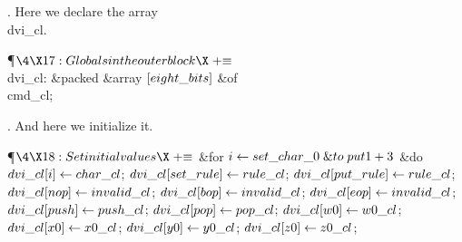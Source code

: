 . Here we declare the array \\{dvi\_cl}.

\Y\P$\4\X17:Globals in the outer block\X\mathrel{+}\S$\6
\4\\{dvi\_cl}: \&{packed} \&{array} $[\\{eight\_bits}]$ \1\&{of}\5
\\{cmd\_cl};\2\par
\fi

. And here we initialize it.

\Y\P$\4\X18:Set initial values\X\mathrel{+}\S$\6
\&{for} $\hbox{$i$}\gets\\{set\_char\_0}\mathrel{\&{to}}\\{put1}+3$ \1\&{do}\5
$\\{dvi\_cl}[\hbox{$i$}]\gets\\{char\_cl}$;\2\6
$\\{dvi\_cl}[\\{set\_rule}]\gets\\{rule\_cl}$;\5
$\\{dvi\_cl}[\\{put\_rule}]\gets\\{rule\_cl}$;\6
$\\{dvi\_cl}[\\{nop}]\gets\\{invalid\_cl}$;\5
$\\{dvi\_cl}[\\{bop}]\gets\\{invalid\_cl}$;\5
$\\{dvi\_cl}[\\{eop}]\gets\\{invalid\_cl}$;\6
$\\{dvi\_cl}[\\{push}]\gets\\{push\_cl}$;\5
$\\{dvi\_cl}[\\{pop}]\gets\\{pop\_cl}$;\6
$\\{dvi\_cl}[\\{w0}]\gets\\{w0\_cl}$;\5
$\\{dvi\_cl}[\\{x0}]\gets\\{x0\_cl}$;\6
$\\{dvi\_cl}[\\{y0}]\gets\\{y0\_cl}$;\5
$\\{dvi\_cl}[\\{z0}]\gets\\{z0\_cl}$;\6
